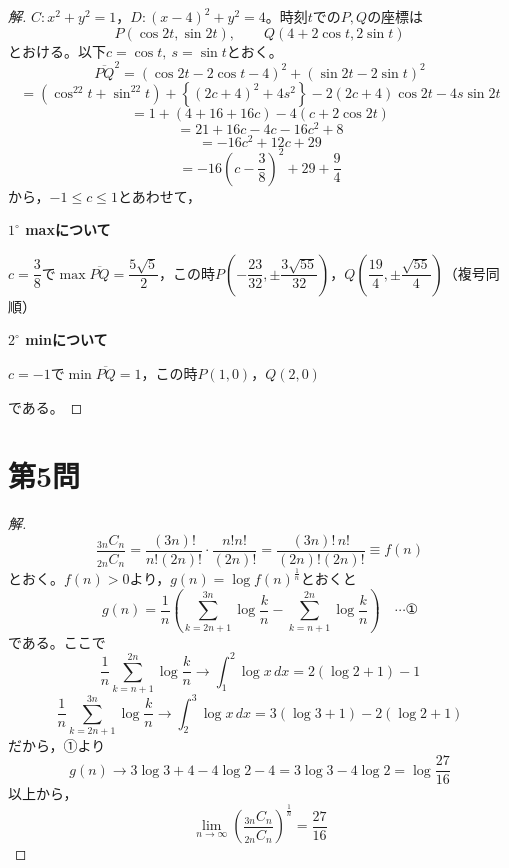 \documentclass[../main.tex]{subfiles}
\begin{document}
\begin{proof}[解]
  $C: x^2+y^2=1$，$D: (x-4)^2+y^2=4$。時刻$t$での$P,Q$の座標は
  \[
    P(\cos2t,\sin2t), \qquad Q(4+2\cos t,2\sin t)
  \]
  とおける。以下$c=\cos t,\ s=\sin t$とおく。
  \[
    \overline{PQ}^2=(\cos2t-2\cos t-4)^2+(\sin2t-2\sin t)^2
  \]
  \[
    =(\cos^22t+\sin^22t)+\left\{(2c+4)^2+4s^2\right\}-2(2c+4)\cos2t-4s\sin2t
  \]
  \[
    =1+(4+16+16c)-4(c+2\cos2t)
  \]
  \[
    =21+16c-4c-16c^2+8
  \]
  \[
    =-16c^2+12c+29
  \]
  \[
    =-16\left(c-\frac38\right)^2+29+\frac94
  \]
  から，$-1\le c\le1$とあわせて，

  \textbf{$1^\circ$ maxについて}

  $c=\dfrac38$で$\max\overline{PQ}=\dfrac{5\sqrt5}{2}$，この時$P\left(-\dfrac{23}{32},\pm\dfrac{3\sqrt{55}}{32}\right)$，$Q\left(\dfrac{19}{4},\pm\dfrac{\sqrt{55}}{4}\right)$（複号同順）

  \textbf{$2^\circ$ minについて}

  $c=-1$で$\min\overline{PQ}=1$，この時$P(1,0)$，$Q(2,0)$

  である。
\end{proof}

\newpage

\section*{第5問}

\begin{proof}[解]
  \[
    \frac{{}_{3n}C_n}{{}_{2n}C_n}=\frac{(3n)!}{n!(2n)!}\cdot\frac{n!n!}{(2n)!}=\frac{(3n)!\,n!}{(2n)!(2n)!}\equiv f(n)
  \]
  とおく。$f(n)>0$より，$g(n)=\log f(n)^{\frac1n}$とおくと
  \[
    g(n)=\frac1n\left(\sum_{k=2n+1}^{3n}\log\frac{k}{n}-\sum_{k=n+1}^{2n}\log\frac{k}{n}\right) \quad\cdots\text{①}
  \]
  である。ここで
  \[
    \frac1n\sum_{k=n+1}^{2n}\log\frac{k}{n}\longrightarrow\int_1^2\log x\,dx=2(\log2+1)-1
  \]
  \[
    \frac1n\sum_{k=2n+1}^{3n}\log\frac{k}{n}\longrightarrow\int_2^3\log x\,dx=3(\log3+1)-2(\log2+1)
  \]
  だから，①より
  \[
    g(n)\longrightarrow3\log3+4-4\log2-4=3\log3-4\log2=\log\frac{27}{16}
  \]
  以上から，
  \[
    \lim_{n\to\infty}\left(\frac{{}_{3n}C_n}{{}_{2n}C_n}\right)^{\frac1n}=\frac{27}{16}
  \]
\end{proof}
\end{document}
